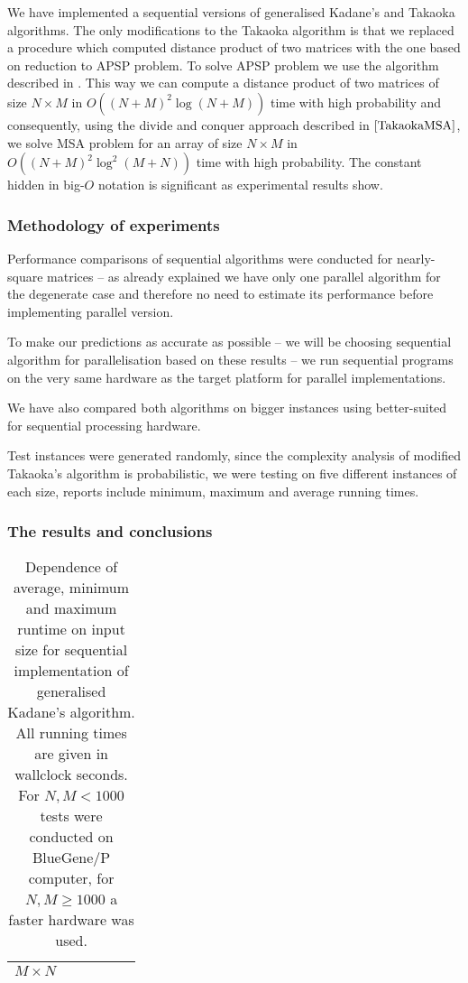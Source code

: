 We have implemented a sequential versions of generalised Kadane's and Takaoka \cite{TakaokaMSA} algorithms.
The only modifications to the Takaoka algorithm is that we replaced a procedure which computed distance product of two matrices with the one based on reduction to APSP problem.
To solve APSP problem we use the algorithm described in \cite{TakaokaHashim}.
This way we can compute a distance product of two matrices of size $N \times M$ in $O((N + M)^2 \log{(N + M)})$ time with high probability and consequently, using the divide and conquer approach described in $\cite{TakaokaMSA}$, we solve MSA problem for an array of size $N \times M$ in $O((N + M)^2 \log^2{(M + N)})$ time with high probability.
The constant hidden in big-$O$ notation is significant as experimental results show.

\subsubsection*{Methodology of experiments}

Performance comparisons of sequential algorithms were conducted for nearly-square matrices -- as already explained we have only one parallel algorithm for the degenerate case and therefore no need to estimate its performance before implementing parallel version.

To make our predictions as accurate as possible -- we will be choosing sequential algorithm for parallelisation based on these results -- we run sequential programs on the very same hardware as the target platform for parallel implementations.

We have also compared both algorithms on bigger instances using better-suited for sequential processing hardware.

Test instances were generated randomly, since the complexity analysis of modified Takaoka's algorithm is probabilistic, we were testing on five different instances of each size, reports include minimum, maximum and average running times.

\subsubsection*{The results and conclusions}

\begin{table}[h!]
\centering
\begin{tabular}{c|c|c|c|c|c|}
$M \times N$ &  &  &  &  &  \\
\hline
\end{tabular}
\caption{Dependence of average, minimum and maximum runtime on input size for sequential implementation of generalised Kadane's algorithm. All running times are given in wallclock seconds. For $N, M < 1000$ tests were conducted on BlueGene/P computer, for $N, M \geq 1000$ a faster hardware was used.}
\end{table}

